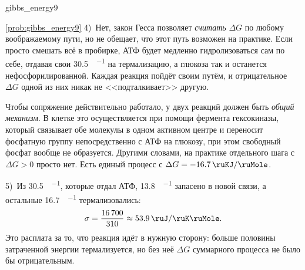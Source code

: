 \begin{problem}{}{gibbs_energy9}
\begin{sol}{\ref{prob:gibbs_energy9}}
        4)~Нет, закон Гесса позволяет \emph{считать} $\Delta G$ по любому воображаемому пути, но не обещает, что этот путь возможен на практике. Если просто смешать всё в пробирке, АТФ будет медленно гидролизоваться сам по себе, отдавая свои \qty{30,5}{\ruKJ\per\ruMole} на термализацию, а глюкоза так и останется нефосфорилированной. Каждая реакция пойдёт своим путём, и отрицательное $\Delta G$ одной из них никак не <<подталкивает>> другую.

        Чтобы сопряжение действительно работало, у двух реакций должен быть \emph{общий механизм}. В клетке это осуществляется при помощи фермента гексокиназы, который связывает обе молекулы в одном активном центре и переносит фосфатную группу непосредственно с АТФ на глюкозу, при этом свободный фосфат вообще не образуется. Другими словами, на практике отдельного шага с $\Delta G > 0$ просто нет. Есть единый процесс с $\Delta G = \qty{-16,7}{\ruKJ\per\ruMole}$.

        5)~Из \qty{30,5}{\ruKJ\per\ruMole}, которые отдал АТФ, \qty{13,8}{\ruKJ\per\ruMole} запасено в новой связи, а остальные \qty{16,7}{\ruKJ\per\ruMole} термализовались:
        \begin{equation*}
            \sigma = \frac{\num{16700}}{\num{310}} \approx \qty{53,9}{\ruJ\per\ruK\ruMole}.
        \end{equation*}
        Это расплата за то, что реакция идёт в нужную сторону: больше половины затраченной энергии термализуется, но без неё $\Delta G$ суммарного процесса не было бы отрицательным.
    \end{sol}
\end{problem}


